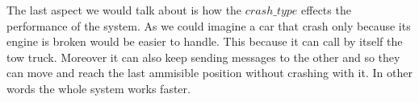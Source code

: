 The last aspect we would talk about is how the $crash\_type$ effects the performance of the system. As we could
imagine a car that crash only because its engine is broken would be easier to handle. This because it can call
by itself the tow truck. Moreover it can also keep sending messages to the other and so they can move and reach
the last ammisible position without crashing with it. In other words the whole system works faster.